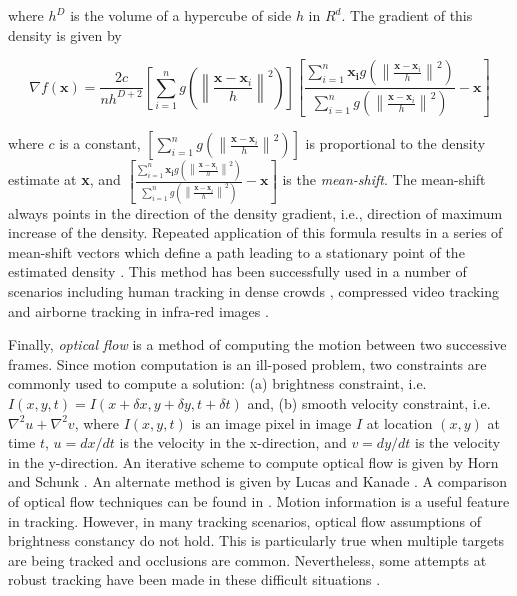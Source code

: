 where $h^D$ is the volume of a hypercube of side $h$ in $R^d$.  The gradient of this density is given by

\begin{equation}
\nabla f(\mathbf{x}) = \frac{2c}{nh^{D+2}} 
\left[ \sum_{i=1}^n  g \left({ \left\|   \frac{\mathbf{x}-\mathbf{x}_i}{h}\right\| }^2 \right) \right] 
\left[ \frac{ \sum_{i=1}^n  \mathbf{\mathbf{x}_i}g \left({ \left\|   \frac{\mathbf{x}-\mathbf{x}_i}{h}\right\| }^2 \right)}{\sum_{i=1}^n  g \left({ \left\|   \frac{\mathbf{x}-\mathbf{x}_i}{h}\right\| }^2 \right)} -\mathbf{x}\right] 
\end{equation}

where $c$ is a constant, $\left[ \sum_{i=1}^n  g \left({ \left\|   \frac{\mathbf{x}-\mathbf{x}_i}{h}\right\| }^2 \right) \right]$ is proportional to the density estimate at \textbf{x}, and $\left[ \frac{ \sum_{i=1}^n  \mathbf{\mathbf{x}_i}g \left({ \left\|   \frac{\mathbf{x}-\mathbf{x}_i}{h}\right\| }^2 \right)}{\sum_{i=1}^n  g \left({ \left\|   \frac{\mathbf{x}-\mathbf{x}_i}{h}\right\| }^2 \right)} -\mathbf{x}\right]$ is the \emph{mean-shift}.  The mean-shift always points in the direction of the density gradient, i.e., direction of maximum increase of the density.  Repeated application of this formula results in a series of mean-shift vectors which define a path leading to a stationary point of the estimated density \cite{2002_JNL_MeanShift_Comaniciu}.  This method has been successfully used in a number of scenarios including human tracking in dense crowds \cite{2000_CNF_RealTimeTrackingMeanShift_Comaniciu}, compressed video tracking \cite{2009_CNF_Compensation_Aslam} and airborne tracking in infra-red images \cite{2003_JNL_AirborneIRtracking_Yilmaz}.  

Finally, \emph{optical flow} is a method of computing the motion between two successive frames.  Since motion computation is an ill-posed problem, two constraints are commonly used to compute a solution: (a) brightness constraint, i.e. $I(x,y,t) = I(x+\delta x,y+\delta y,t+\delta t)$ and, (b) smooth velocity constraint, i.e. $\nabla^2 u + \nabla^2 v$, where $I(x,y,t)$ is an image pixel in image $I$ at location $(x,y)$ at time $t$, $u=dx/dt$ is the velocity in the x-direction, and $v=dy/dt$ is the velocity in the y-direction.  An iterative scheme to compute optical flow is given by Horn and Schunk \cite{1981_JNL_OpticalFlow_HornSchunck}.  An alternate method is given by Lucas and Kanade \cite{1981_CNF_IterativeImageRegistration_LucasKanade}.  A comparison of optical flow techniques can be found in \cite{1994_JNL_PerfOpticalFlow_Barron}.  Motion information is a useful feature in tracking.  However, in many tracking scenarios, optical flow assumptions of brightness constancy do not hold.  This is particularly true when multiple targets are being tracked and occlusions are common.  Nevertheless, some attempts at robust tracking have been made in these difficult situations \cite{1996_CNF_MultipleMotionsFlowFields_Black}.

